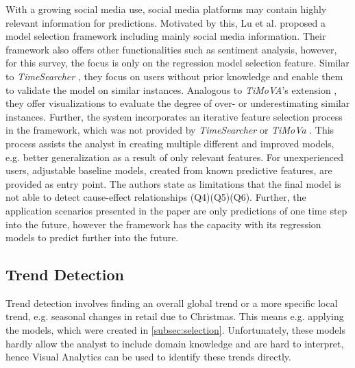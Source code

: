 \documentclass[electronic]{vgtc}             %
\begin{document}
With a growing social media use, social media platforms may contain highly relevant information for predictions. 
Motivated by this, Lu et al. \cite{lu:2014} proposed a model selection framework including mainly social media information. 
Their framework also offers other functionalities such as sentiment analysis, however, for this survey, the focus is only on the regression model selection feature.
Similar to \textit{TimeSearcher} \cite{buono:2007}, they focus on users without prior knowledge and enable them to validate the model on similar instances. 
Analogous to \textit{TiMoVA}'s extension \cite{boegl:2014}, they offer visualizations to evaluate the degree of over- or underestimating similar instances.
Further, the system incorporates an iterative feature selection process in the framework, which was not provided by \textit{TimeSearcher} \cite{buono:2007} or \textit{TiMoVa} \cite{boegl:2013}.
This process assists the analyst in creating multiple different and improved models, e.g. better generalization as a result of only relevant features.
For unexperienced users, adjustable baseline models, created from known predictive features, are provided as entry point.
The authors state as limitations that the final model is not able to detect cause-effect relationships (Q4)(Q5)(Q6). 
Further, the application scenarios presented in the paper are only predictions of one time step into the future, however the framework has the capacity with its regression models to predict further into the future.


\subsection{Trend Detection\label{subsec:trend}}
Trend detection involves finding an overall global trend or a more specific local trend, e.g. seasonal changes in retail due to Christmas.
This means e.g. applying the models, which were created in \autoref{subsec:selection}.
Unfortunately, these models hardly allow the analyst to include domain knowledge and are hard to interpret, hence Visual Analytics can be used to identify these trends directly.
\end{document}
